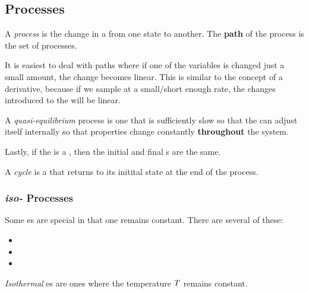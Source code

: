 \subsection{Processes}\label{subsec:Processes}
\begin{definition}[Process]\label{def:Process}
  A \emph{process} is the change in a  from one  state to another.
  The \textbf{path} of the process is the set of  processes.

  It is easiest to deal with paths where if one of the variables is changed just a small amount, the change becomes linear.
  This is similar to the concept of a derivative, because if we sample at a small/short enough rate, the changes introduced to the  will be linear.
\end{definition}

\begin{definition}\label{def:Quasi-equilibrium}
  A \emph{quasi-equilibrium} process is one that is sufficiently slow so that the  can adjust itself internally so that properties change constantly \textbf{throughout} the system.
\end{definition}

Lastly, if the  is a , then the initial and final s are the same.
\begin{definition}[Cycle]\label{def:Cycle}
  A \emph{cycle} is a  that returns to its initital state at the end of the process.
\end{definition}

\subsubsection{\textit{iso-} Processes}\label{subsubsec:Iso_Processes}
Some es are special in that one  remains constant.
There are several of these:
\begin{itemize}[noitemsep]
\item {}
\item {}
\item {}
\end{itemize}

\begin{definition}[Isothermal]\label{def:Isothermal}
  \emph{Isothermal} es are ones where the temperature $T$ remains constant.
\end{definition}

